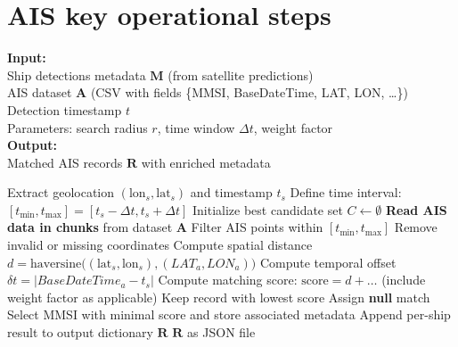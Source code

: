 \documentclass{article}
\begin{document}
\newpage
\section{AIS key operational steps}
\begin{algorithm}[H]
	\caption{AIS Matching for Detected Ships}
	\label{alg:ais-matching}
	\textbf{Input:} \\
	\hspace*{1em} Ship detections metadata $\mathbf{M}$ (from satellite predictions) \\
	\hspace*{1em} AIS dataset $\mathbf{A}$ (CSV with fields \{MMSI, BaseDateTime, LAT, LON, \ldots\}) \\
	\hspace*{1em} Detection timestamp $t$ \\
	\hspace*{1em} Parameters: search radius $r$, time window $\Delta t$, weight factor \\
	
	\textbf{Output:} \\
	\hspace*{1em} Matched AIS records $\mathbf{R}$ with enriched metadata \\
	
	\begin{algorithmic}[1]
		\State Extract geolocation $(\text{lon}_s, \text{lat}_s)$ and timestamp $t_s$
		\State Define time interval: $[t_{\min}, t_{\max} ] = [t_s - \Delta t, t_s + \Delta t ]$
		\State Initialize best candidate set $C \gets \emptyset$
		\State \textbf{Read AIS data in chunks} from dataset $\mathbf{A}$
		\State \hspace{1em} Filter AIS points within $[t_{\min}, t_{\max} ]$
		\State \hspace{1em} Remove invalid or missing coordinates
		\State Compute spatial distance $d = \text{haversine}\big((\text{lat}_s, \text{lon}_s),(LAT_a, LON_a)\big)$
		\State Compute temporal offset $\delta t = |BaseDateTime_a - t_s|$
		\State Compute matching score: $\text{score} = d + \ldots$ (include weight factor as applicable)
		\State Keep record with lowest score
		\EndIf
		\EndFor
		\EndFor
		\State Assign \textbf{null} match
		\Else
		\State Select MMSI with minimal score and store associated metadata
		\EndIf
		\State Append per-ship result to output dictionary $\mathbf{R}$
		\State \Return $\mathbf{R}$ as JSON file
	\end{algorithmic}
\end{algorithm}
	
\end{document}
